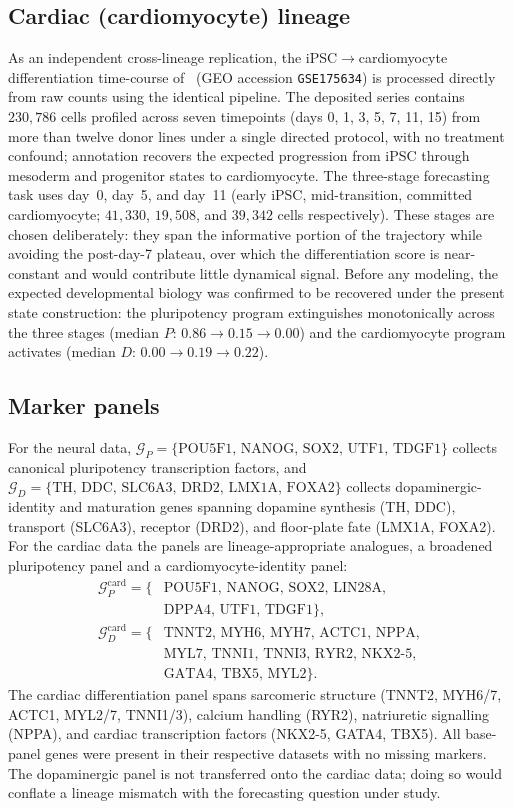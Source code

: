 \documentclass[10pt,journal,compsoc]{IEEEtran}
\begin{document}
\subsection{Cardiac (cardiomyocyte) lineage}
As an independent cross-lineage replication, the iPSC$\rightarrow$cardiomyocyte differentiation time-course of~\cite{elorbany2022single} (GEO accession \texttt{GSE175634}) is processed directly from raw counts using the identical pipeline. The deposited series contains $230{,}786$ cells profiled across seven timepoints (days 0, 1, 3, 5, 7, 11, 15) from more than twelve donor lines under a single directed protocol, with no treatment confound; annotation recovers the expected progression from iPSC through mesoderm and progenitor states to cardiomyocyte. The three-stage forecasting task uses day~0, day~5, and day~11 (early iPSC, mid-transition, committed cardiomyocyte; $41{,}330$, $19{,}508$, and $39{,}342$ cells respectively). These stages are chosen deliberately: they span the informative portion of the trajectory while avoiding the post-day-7 plateau, over which the differentiation score is near-constant and would contribute little dynamical signal. Before any modeling, the expected developmental biology was confirmed to be recovered under the present state construction: the pluripotency program extinguishes monotonically across the three stages (median $P$: $0.86\!\rightarrow\!0.15\!\rightarrow\!0.00$) and the cardiomyocyte program activates (median $D$: $0.00\!\rightarrow\!0.19\!\rightarrow\!0.22$).

\subsection{Marker panels}
For the neural data, $\mathcal{G}_P=\{\mathrm{POU5F1,\,NANOG,\,SOX2,\,UTF1,\,TDGF1}\}$ collects canonical pluripotency transcription factors, and $\mathcal{G}_D=\{\mathrm{TH,\,DDC,\,SLC6A3,\,DRD2,\,LMX1A,\,FOXA2}\}$ collects dopaminergic-identity and maturation genes spanning dopamine synthesis (\textrm{TH, DDC}), transport (\textrm{SLC6A3}), receptor (\textrm{DRD2}), and floor-plate fate (\textrm{LMX1A, FOXA2}). For the cardiac data the panels are lineage-appropriate analogues, a broadened pluripotency panel and a cardiomyocyte-identity panel:
\begin{align*}
\mathcal{G}_P^{\mathrm{card}}=\{&\mathrm{POU5F1,\,NANOG,\,SOX2,\,LIN28A,}\\
&\mathrm{DPPA4,\,UTF1,\,TDGF1}\},\\
\mathcal{G}_D^{\mathrm{card}}=\{&\mathrm{TNNT2,\,MYH6,\,MYH7,\,ACTC1,\,NPPA,}\\
&\mathrm{MYL7,\,TNNI1,\,TNNI3,\,RYR2,\,NKX2\text{-}5,}\\
&\mathrm{GATA4,\,TBX5,\,MYL2}\}.
\end{align*}
The cardiac differentiation panel spans sarcomeric structure (\textrm{TNNT2, MYH6/7, ACTC1, MYL2/7, TNNI1/3}), calcium handling (\textrm{RYR2}), natriuretic signalling (\textrm{NPPA}), and cardiac transcription factors (\textrm{NKX2-5, GATA4, TBX5}). All base-panel genes were present in their respective datasets with no missing markers. The dopaminergic panel is not transferred onto the cardiac data; doing so would conflate a lineage mismatch with the forecasting question under study.
\end{document}
